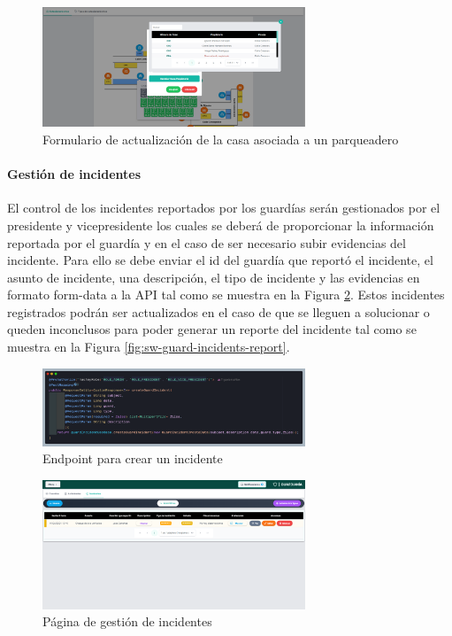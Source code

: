 \begin{figure}[H]
\centering
\includegraphics[width=0.7\textwidth]{resources/images/sw-parking-form}
\caption{Formulario de actualización de la casa asociada a un parqueadero}
\label{fig:sw-parking-form}
\end{figure}

\paragraph{Gestión de incidentes}

El control de los incidentes reportados por los guardías serán gestionados por el presidente y vicepresidente los cuales se deberá de proporcionar la información reportada por el guardía y en el caso de ser necesario subir evidencias del incidente.
Para ello se debe enviar el id del guardía que reportó el incidente, el asunto de incidente, una descripción, el tipo de incidente y las evidencias en formato form-data a la API tal como se muestra en la Figura \ref{fig:api-incident-create}.
Estos incidentes registrados podrán ser actualizados en el caso de que se lleguen a solucionar o queden inconclusos para poder generar un reporte del incidente tal como se muestra en la Figura \ref{fig:sw-guard-incidents-report}.

\begin{figure}[H]
    \centering
    \includegraphics[width=0.7\textwidth]{resources/images/api-guard-indicent-endpoint}
    \caption{Endpoint para crear un incidente}
    \label{fig:api-incident-create}
\end{figure}

\begin{figure}[H]
    \centering
    \includegraphics[width=0.7\textwidth]{resources/images/sw-guard-incidents}
    \caption{Página de gestión de incidentes}
    \label{fig:sw-guard-incidents}
\end{figure}

